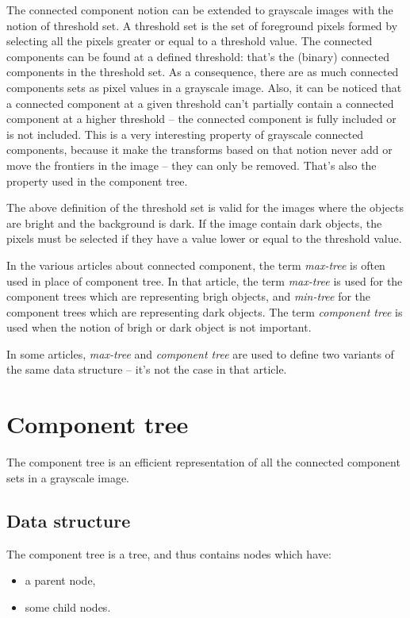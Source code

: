 \documentclass{InsightArticle}
\begin{document}
The connected component notion can be extended to grayscale images with the notion of threshold set.
A threshold set is the set of foreground pixels formed by selecting all the pixels greater or equal to a threshold value. The connected components can be found at a defined threshold: that's the (binary) connected components in the threshold set. As a consequence, there are as much connected components sets as pixel values in a grayscale image.
Also, it can be noticed that a connected component at a given threshold can't partially contain a connected component at a higher threshold -- the connected component is fully included or is not included. This is a very interesting property of grayscale connected components, because it make the transforms based on that notion never add or move the frontiers in the image -- they can only be removed. That's also the property used in the component tree.

The above definition of the threshold set is valid for the images where the objects are bright and the background is dark. If the image contain dark objects, the pixels must be selected if they have a value lower or equal to the threshold value.

In the various articles about connected component, the term {\em max-tree} is often used in place of {component tree}. In that article, the term {\em max-tree} is used for the component trees which are representing brigh objects, and {\em min-tree} for the component trees which are representing dark objects. The term {\em component tree} is used when the notion of brigh or dark object is not important.

In some articles, {\em max-tree} and {\em component tree} are used to define two variants of the same data structure -- it's not the case in that article.

\section{Component tree}

The component tree is an efficient representation of all the connected component sets in a grayscale image.

  \subsection{Data structure}

The component tree is a tree, and thus contains nodes which have:
\begin{itemize}
 \item a parent node,
 \item some child nodes.
\end{itemize}
\end{document}
